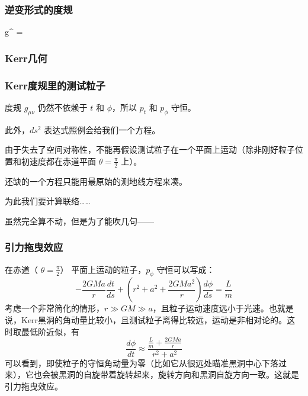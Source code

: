 \documentclass[CJK,13pt]{beamer}
\begin{document}
  \begin{frame}
    \frametitle{逆变形式的度规}

    \be
    g^{\mu\nu} = 
    \ee

  \end{frame}
  

  \begin{frame}
    \frametitle{Kerr几何}
  \end{frame}  


  \begin{frame}
    \frametitle{Kerr度规里的测试粒子}
    度规 $g_{\mu\nu}$ 仍然不依赖于 $t$ 和 $\phi$，所以 $p_t$ 和 $p_\phi$ 守恒。

    \skipline
    
    此外，$ds^2$ 表达式照例会给我们一个方程。

    \skipline
    
    由于失去了空间对称性，{\blue 不能再假设测试粒子在一个平面上运动}（除非刚好粒子位置和初速度都在赤道平面 $\theta=\frac{\pi}{2}$ 上）。

    \skipline
    
    还缺的一个方程只能用最原始的测地线方程来凑。

    \skipline
    
    为此我们要计算联络……


  \end{frame}
  

  \begin{frame}
  \end{frame}


  \begin{frame}
    虽然完全算不动，但是为了能吹几句——
  \end{frame}


  \begin{frame}
    \frametitle{引力拖曳效应}
    在赤道（ $\theta=\frac{\pi}{2}$） 平面上运动的粒子，$p_\phi$ 守恒可以写成：
    $$ -\frac{2GMa}{r}\frac{dt}{ds}+\left(r^2+a^2+\frac{2GMa^2}{r}\right)\frac{d\phi}{ds} = \frac{L}{m}$$    
    考虑一个非常简化的情形，$r\gg GM \gg a $，且粒子运动速度远小于光速。也就是说，Kerr黑洞的角动量比较小，且测试粒子离得比较远，运动是非相对论的。这时取最低阶近似，有
    $$ \frac{d\phi}{dt} \approx \frac{\frac{L}{m}+\frac{2GMa}{r}}{r^2+a^2}$$
    可以看到，即使粒子的守恒角动量为零（比如它从很远处瞄准黑洞中心下落过来），它也会被黑洞的自旋带着旋转起来，旋转方向和黑洞自旋方向一致。这就是引力拖曳效应。
  \end{frame}
  
\end{document}
